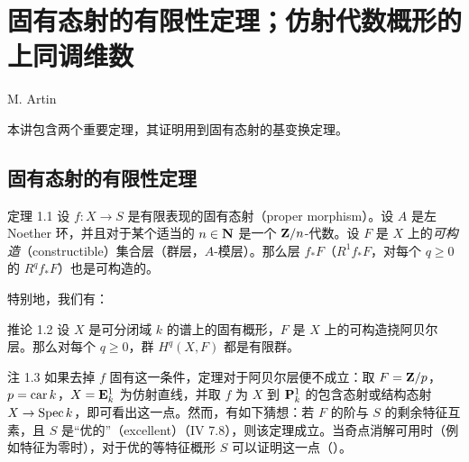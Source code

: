 \chapter[固有态射的有限性与仿射上同调维数]{固有态射的有限性定理；仿射代数概形的上同调维数}
\begin{center}
M. Artin
\end{center}
\label{sga4.exp.XIV}

\setcounter{pageoriginal}{144}

\newcommand{\degtr}{{\rm deg.tr.\ }}

本\pageoriginale 讲包含两个重要定理，其证明用到固有态射的基变换定理。

\section{固有态射的有限性定理}

\begin{enonce*}{定理 1.1}
设 $f:X\rightarrow S$ 是有限表现的固有态射（proper morphism）。设 $A$ 是左 Noether 环，并且对于某个适当的 $n\in\mathbf{N}$ 是一个 $\mathbf{Z}/n$-代数。设 $F$ 是 $X$ 上的\emph{可构造}（constructible）集合层（\resp 群层，\resp $A$-模层）。那么层 $f_*F$（\resp $R^1f_*F$，\resp 对每个 $q\geq0$ 的 $R^qf_*F$）也是可构造的。
\end{enonce*}

特别地，我们有：

\begin{enonce*}{推论 1.2}
设 $X$ 是可分闭域 $k$ 的谱上的固有概形，$F$ 是 $X$ 上的可构造挠阿贝尔层。那么对每个 $q\geq0$，群 $H^q(X,F)$ 都是有限群。
\end{enonce*}

\begin{enonce*}[remark]{注 1.3}
如果去掉 $f$ 固有这一条件，定理对于阿贝尔层便不成立：取 $F=\mathbf{Z}/p$，$p=\operatorname{car} k$，$X=\mathbf{E}^1_k$ 为仿射直线，并取 $f$ 为 $X$ 到 $\mathbf{P}^1_k$ 的包含态射或结构态射 $X\rightarrow\operatorname{Spec} k$，即可看出这一点。然而，有如下猜想：若 $F$ 的阶与 $S$ 的\pageoriginale 剩余特征互素，且 $S$ 是“优的”（excellent）（\EGA IV 7.8），则该定理成立。当奇点消解可用时（例如特征为零时），对于优的等特征概形 $S$ 可以证明这一点（）。
\end{enonce*}

